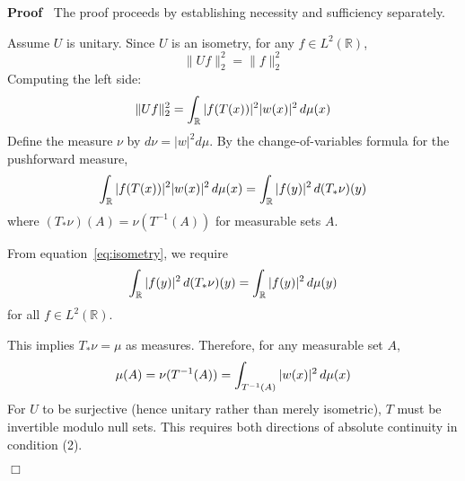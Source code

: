 \documentclass{article}
\newcommand{\tmtextbf}[1]{\text{{\bfseries{#1}}}}
\newenvironment{proof}{\noindent\textbf{Proof\ }}{\hspace*{\fill}$\Box$\medskip}
\begin{document}
\begin{proof}
  The proof proceeds by establishing necessity and sufficiency separately.
  
  \tmtextbf{Necessity:} Assume $U$ is unitary. Since $U$ is an isometry, for
  any $f \in L^2 (\mathbb{R})$,
  \begin{equation}
    \label{eq:isometry} \|Uf\|_2^2 = \|f\|_2^2
  \end{equation}
  Computing the left side:
  \begin{equation}
    \|Uf\|_2^2 = \int_{\mathbb{R}} |f (T (x)) |^2 |w (x) |^2  \hspace{0.17em}
    d \mu (x)
  \end{equation}
  Define the measure $\nu$ by $d \nu = |w|^2 d \mu$. By the
  change-of-variables formula for the pushforward measure,
  \begin{equation}
    \int_{\mathbb{R}} |f (T (x)) |^2 |w (x) |^2 \hspace{0.17em} d \mu (x) =
    \int_{\mathbb{R}} |f (y) |^2  \hspace{0.17em} d (T_{\ast} \nu) (y)
  \end{equation}
  where $(T_{\ast} \nu) (A) = \nu (T^{- 1} (A))$ for measurable sets $A$.
  
  From equation~\eqref{eq:isometry}, we require
  \begin{equation}
    \label{eq:measure-condition} \int_{\mathbb{R}} |f (y) |^2  \hspace{0.17em}
    d (T_{\ast} \nu) (y) = \int_{\mathbb{R}} |f (y) |^2  \hspace{0.17em} d \mu
    (y)
  \end{equation}
  for all $f \in L^2 (\mathbb{R})$.
  
  This implies $T_{\ast} \nu = \mu$ as measures. Therefore, for any measurable
  set $A$,
  \begin{equation}
    \mu (A) = \nu (T^{- 1} (A)) = \int_{T^{- 1} (A)} |w (x) |^2 
    \hspace{0.17em} d \mu (x)
  \end{equation}
  For $U$ to be surjective (hence unitary rather than merely isometric), $T$
  must be invertible modulo null sets. This requires both directions of
  absolute continuity in condition (2).
  

\end{proof}
\end{document}
